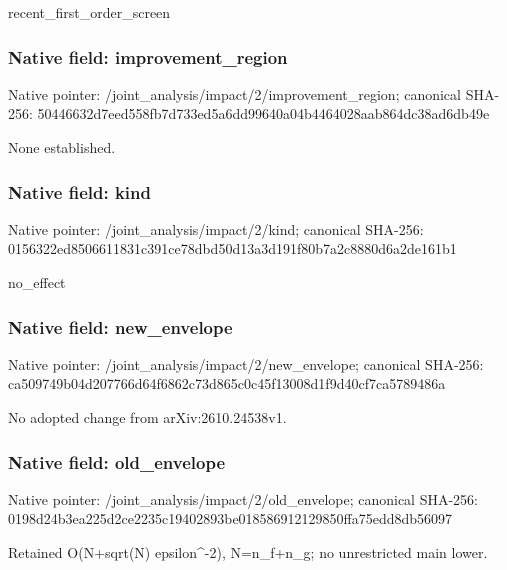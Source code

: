 \documentclass[10pt,a4paper]{article}
\begin{document}
\begingroup\raggedright\sloppy recent\_\allowbreak{}first\_\allowbreak{}order\_\allowbreak{}screen\par\endgroup

\subsubsection{Native field: improvement\_\allowbreak{}region}
Native pointer: /joint\_\allowbreak{}analysis/impact/2/improvement\_\allowbreak{}region; canonical SHA-256: 50446632d7eed558fb7d733ed5a6dd99640a04b4464028aab864dc38ad6db49e

\begingroup\raggedright\sloppy None established.\par\endgroup

\subsubsection{Native field: kind}
Native pointer: /joint\_\allowbreak{}analysis/impact/2/kind; canonical SHA-256: 0156322ed8506611831c391ce78dbd50d13a3d191f80b7a2c8880d6a2de161b1

\begingroup\raggedright\sloppy no\_\allowbreak{}effect\par\endgroup

\subsubsection{Native field: new\_\allowbreak{}envelope}
Native pointer: /joint\_\allowbreak{}analysis/impact/2/new\_\allowbreak{}envelope; canonical SHA-256: ca509749b04d207766d64f6862c73d865c0c45f13008d1f9d40cf7ca5789486a

\begingroup\raggedright\sloppy No adopted change from arXiv:\allowbreak{}2610.24538v1.\par\endgroup

\subsubsection{Native field: old\_\allowbreak{}envelope}
Native pointer: /joint\_\allowbreak{}analysis/impact/2/old\_\allowbreak{}envelope; canonical SHA-256: 0198d24b3ea225d2ce2235c19402893be018586912129850ffa75edd8db56097

\begingroup\raggedright\sloppy Retained O(N+sqrt(N) epsilon\textasciicircum{}-2),\allowbreak{} N=\allowbreak{}n\_\allowbreak{}f+n\_\allowbreak{}g;\allowbreak{} no unrestricted main lower.\par\endgroup
\end{document}
